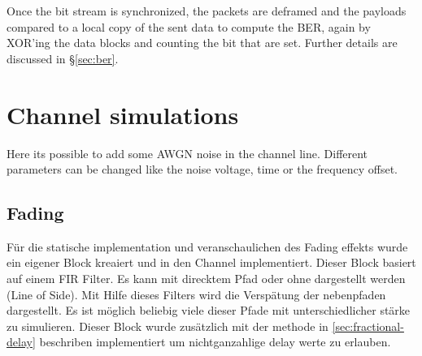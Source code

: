 Once the bit stream is synchronized, the packets are deframed and the payloads compared to a local copy of the sent data to compute the BER, again by XOR'ing the data blocks and counting the bit that are set. Further details are discussed in \S\ref{sec:ber}.

\section{Channel simulations}

Here its possible to add some AWGN noise in the channel line. Different parameters can be changed like the noise voltage, time or the frequency offset.


%
%

\subsection{Fading}
Für die statische implementation und veranschaulichen des Fading effekts wurde ein eigener Block kreaiert und in den Channel implementiert. Dieser Block basiert auf einem FIR Filter. Es kann mit direcktem Pfad oder ohne dargestellt werden (Line of Side). Mit Hilfe dieses Filters wird die Verspätung der nebenpfaden dargestellt. Es ist möglich beliebig viele dieser Pfade mit unterschiedlicher stärke zu simulieren. Dieser Block wurde zusätzlich mit der methode in \ref{sec:fractional-delay} beschriben implementiert um nichtganzahlige delay werte zu erlauben.

